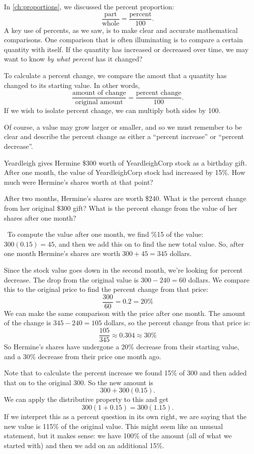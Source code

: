 In \cref{ch:proportions}, we discussed the percent proportion:
\[\frac{\text{part}}{\text{whole}} = \frac{\text{percent}}{100}.\]
A key use of percents, as we saw, is to make clear and accurate mathematical comparisons. One comparison that is often illuminating is to compare a certain quantity with itself. If the quantity has increased or decreased over time, we may want to know \textit{by what percent} has it changed?

To calculate a percent change, we compare the amout that a quantity has changed to its starting value. In other words, 
\[\frac{\text{amount of change}}{\text{original amount}} = \frac{\text{percent change}}{100}.\]
If we wish to isolate percent change, we can multiply both sides by 100.

Of course, a value may grow larger or smaller, and so we must remember to be clear and describe the percent change as either a ``percent increase'' or ``percent decrease''.

\begin{boxex}
Yeardleigh gives Hermine \$300 worth of YeardleighCorp stock as a birthday gift. After one month, the value of YeardleighCorp stock had increased by 15\%. How much were Hermine's shares worth at that point?

After two months, Hermine's shares are worth \$240. What is the percent change from her original \$300 gift? What is the percent change from the value of her shares after one month?


\exsoln\ To compute the value after one month, we find \%15 of the value: $300(0.15) = 45$, and then we add this on to find the new total value. So, after one month Hermine's shares are worth $300 + 45 = 345$ dollars.

Since the stock value goes down in the second month, we're looking for percent decrease. The drop from the original value is $300-240=60$ dollars. We compare this to the original price to find the percent change from that price: \[\frac{300}{60} = 0.2 = 20\%\]
We can make the same comparison with the price after one month. The amount of the change is $345-240=105$ dollars, so the percent change from that price is: \[\frac{105}{345} \approx 0.304 \approx 30\%\]
So Hermine's shares have undergone a 20\% decrease from their starting value, and a 30\% decrease from their price one month ago.
\end{boxex}

Note that to calculate the percent increase we found 15\% of 300 and then added that on to the original 300. So the new amount is \[300 + 300(0.15).\] We can apply the distributive property to this and get \[300(1+0.15) = 300(1.15).\] If we interpret this as a percent question in its own right, we are saying that the new value is 115\% of the original value. This might seem like an unusual statement, but it makes sense: we have 100\% of the amount (all of what we started with) and then we add on an additional 15\%.

